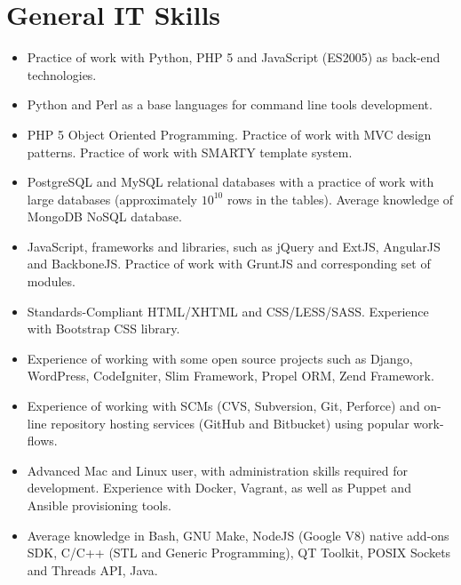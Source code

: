 \documentclass[a4paper,10pt]{article}
\begin{document}
\section{General IT Skills}
\begin{itemize}
  \item[] Practice of work with Python, PHP 5 and JavaScript (ES2005) as
          back-end technologies.
  \item[] Python and Perl as a base languages for command line tools
          development.
  \item[] PHP 5 Object Oriented Programming. Practice of work with MVC design
          patterns. Practice of work with SMARTY template system.
  \item[] PostgreSQL and MySQL relational databases with a practice of work
          with large databases (approximately $10^{10}$ rows in the tables).
          Average knowledge of MongoDB NoSQL database.
  \item[] JavaScript, frameworks and libraries, such as jQuery and ExtJS,
          AngularJS and BackboneJS. Practice of work with GruntJS and
          corresponding set of modules.
  \item[] Standards-Compliant HTML/XHTML and CSS/LESS/SASS. Experience with
          Bootstrap CSS library.
  \item[] Experience of working with some open source projects such as Django,
          WordPress, CodeIgniter, Slim Framework, Propel ORM, Zend Framework.
  \item[] Experience of working with SCMs (CVS, Subversion, Git, Perforce) and
          on-line repository hosting services (GitHub and Bitbucket) using
          popular work-flows.
  \item[] Advanced Mac and Linux user, with administration skills required for
          development. Experience with Docker, Vagrant, as well as Puppet and
          Ansible provisioning tools.
  \item[] Average knowledge in Bash, GNU Make, NodeJS (Google V8) native
          add-ons SDK, C/C++ (STL and Generic Programming), QT Toolkit, POSIX
          Sockets and Threads API, Java.
\end{itemize}


\end{document}
